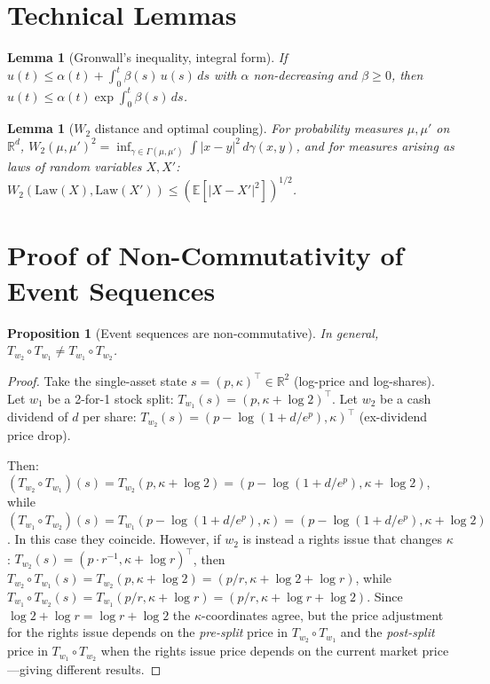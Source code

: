 \documentclass[12pt,a4paper]{article}
\theoremstyle{plain}
\newtheorem{proposition}[theorem]{Proposition}
\newtheorem{lemma}[theorem]{Lemma}
\theoremstyle{definition}
\newcommand{\R}{\mathbb{R}}
\newcommand{\E}{\mathbb{E}}
\newcommand{\Law}{\mathrm{Law}}
\newcommand{\1}{\mathbbm{1}}
\begin{document}
\appendix

\section{Technical Lemmas}
\label{app:lemmas}

\begin{lemma}[Gronwall's inequality, integral form]
\label{lem:gronwall}
If $u(t) \leq \alpha(t) + \int_0^t \beta(s)\,u(s)\,ds$ with $\alpha$ non-decreasing
and $\beta \geq 0$, then $u(t) \leq \alpha(t)\exp\!\int_0^t\beta(s)\,ds$.
\end{lemma}

\begin{lemma}[$W_2$ distance and optimal coupling]
\label{lem:w2}
For probability measures $\mu, \mu'$ on $\R^d$,
$W_2(\mu,\mu')^2 = \inf_{\gamma \in \Gamma(\mu,\mu')} \int |x-y|^2\,d\gamma(x,y)$,
and for measures arising as laws of random variables $X, X'$:
$W_2(\Law(X), \Law(X')) \leq (\E[|X-X'|^2])^{1/2}$.
\end{lemma}

\section{Proof of Non-Commutativity of Event Sequences}
\label{app:noncomm}

\begin{proposition}[Event sequences are non-commutative]
In general, $T_{w_2} \circ T_{w_1} \neq T_{w_1} \circ T_{w_2}$.
\end{proposition}

\begin{proof}
Take the single-asset state $s = (p, \kappa)^\top \in \R^2$ (log-price and
log-shares). Let $w_1$ be a 2-for-1 stock split: $T_{w_1}(s) = (p, \kappa + \log 2)^\top$.
Let $w_2$ be a cash dividend of $d$ per share:
$T_{w_2}(s) = (p - \log(1 + d/e^p), \kappa)^\top$ (ex-dividend price drop).

Then:
$(T_{w_2} \circ T_{w_1})(s) = T_{w_2}(p, \kappa+\log 2) = (p - \log(1+d/e^p), \kappa+\log 2)$,
while
$(T_{w_1} \circ T_{w_2})(s) = T_{w_1}(p-\log(1+d/e^p), \kappa) = (p-\log(1+d/e^p), \kappa+\log 2)$.
In this case they coincide. However, if $w_2$ is instead a rights issue that
changes $\kappa$: $T_{w_2}(s) = (p\cdot r^{-1}, \kappa + \log r)^\top$, then
$T_{w_2} \circ T_{w_1}(s) = T_{w_2}(p, \kappa+\log 2) = (p/r, \kappa+\log 2 + \log r)$,
while $T_{w_1} \circ T_{w_2}(s) = T_{w_1}(p/r, \kappa+\log r) = (p/r, \kappa+\log r + \log 2)$.
Since $\log 2 + \log r = \log r + \log 2$ the $\kappa$-coordinates agree, but the
price adjustment for the rights issue depends on the \emph{pre-split} price in
$T_{w_2} \circ T_{w_1}$ and the \emph{post-split} price in $T_{w_1} \circ T_{w_2}$
when the rights issue price depends on the current market price—giving different
results.
\end{proof}
\end{document}
